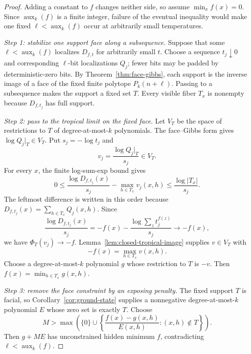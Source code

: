 \documentclass{article}
\begin{document}
\begin{proof}
Adding a constant to $f$ changes neither side, so assume $\min_x f(x)=0$.
Since $\operatorname{aux}_k(f)$ is a finite integer, failure of the eventual
inequality would make one fixed
$\ell<\operatorname{aux}_k(f)$ occur at arbitrarily small temperatures.

\emph{Step 1: stabilize one support face along a subsequence.}
Suppose that some $\ell<\operatorname{aux}_k(f)$ localizes $D_{f,t}$ for
arbitrarily small $t$.  Choose a sequence $t_j\downarrow0$ and corresponding
$\ell$-bit localizations $Q_j$; fewer bits may be padded by deterministic-zero
bits.  By Theorem~\ref{thm:face-gibbs}, each support is the inverse image of a
face of the fixed finite polytope $P_k(n+\ell)$.  Passing to a subsequence
makes the support a fixed set $T$.  Every visible fiber $T_x$ is nonempty
because $D_{f,t_j}$ has full support.

\emph{Step 2: pass to the tropical limit on the fixed face.}
Let $V_T$ be the space of restrictions to $T$ of degree-at-most-$k$
polynomials.  The face--Gibbs form gives $\log Q_j|_T\in V_T$.  Put
$s_j=-\log t_j$ and
\[
  v_j=\frac{\log Q_j|_T}{s_j}\in V_T.
\]
For every $x$, the finite log-sum-exp bound gives
\[
  0\le
  \frac{\log D_{f,t_j}(x)}{s_j}
  -\max_{h\in T_x}v_j(x,h)
  \le\frac{\log|T_x|}{s_j}.
\]
The leftmost difference is written in this order because
$D_{f,t_j}(x)=\sum_{h\in T_x}Q_j(x,h)$.  Since
\[
  \frac{\log D_{f,t_j}(x)}{s_j}
  =-f(x)-\frac{
    \log\sum_z t_j^{f(z)}}{s_j}
  \longrightarrow-f(x),
\]
we have $\Phi_T(v_j)\to-f$.  Lemma~\ref{lem:closed-tropical-image} supplies
$v\in V_T$ with
\[
  -f(x)=\max_{h\in T_x}v(x,h).
\]
Choose a degree-at-most-$k$ polynomial $g$ whose restriction to $T$ is
$-v$.  Then $f(x)=\min_{h\in T_x}g(x,h)$.

\emph{Step 3: remove the face constraint by an exposing penalty.}
The fixed support $T$ is facial, so Corollary~\ref{cor:ground-state} supplies
a nonnegative degree-at-most-$k$ polynomial $E$ whose zero set is exactly
$T$.  Choose
\[
  M>
  \max\left(
    \{0\}\cup
    \left\{\frac{f(x)-g(x,h)}{E(x,h)}:(x,h)\notin T\right\}
  \right).
\]
Then $g+ME$ has unconstrained hidden minimum $f$, contradicting
$\ell<\operatorname{aux}_k(f)$.
\end{proof}
\end{document}
